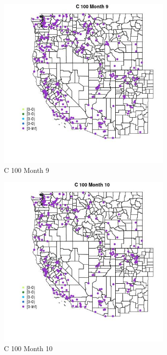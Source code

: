 \begin{figure} 
\centering  
\includegraphics[width=0.77\textwidth]{Code_Outputs/Report_ML_input_PM25_Step4_part_e_de_duplicated_aveswNAs_MapObsMo9C_100.jpg} 
\caption{\label{fig:Report_ML_input_PM25_Step4_part_e_de_duplicated_aveswNAsMapObsMo9C_100}C 100 Month 9} 
\end{figure} 
 

\begin{figure} 
\centering  
\includegraphics[width=0.77\textwidth]{Code_Outputs/Report_ML_input_PM25_Step4_part_e_de_duplicated_aveswNAs_MapObsMo10C_100.jpg} 
\caption{\label{fig:Report_ML_input_PM25_Step4_part_e_de_duplicated_aveswNAsMapObsMo10C_100}C 100 Month 10} 
\end{figure} 
 

